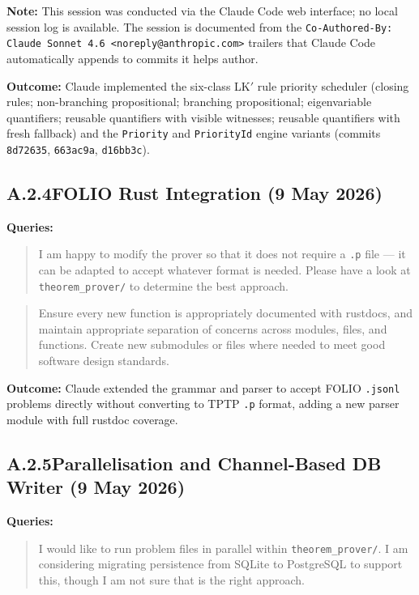 \textbf{Note:} This session was conducted via the Claude Code web interface;
no local session log is available. The session is documented from the
\texttt{Co-Authored-By: Claude Sonnet 4.6 <noreply@anthropic.com>} trailers
that Claude Code automatically appends to commits it helps author.

\textbf{Outcome:} Claude implemented the six-class LK$'$ rule priority scheduler
(closing rules; non-branching propositional; branching propositional;
  eigenvariable quantifiers; reusable quantifiers with visible witnesses;
reusable quantifiers with fresh fallback) and the \texttt{Priority} and
\texttt{PriorityId} engine variants
(commits \texttt{8d72635}, \texttt{663ac9a}, \texttt{d16bb3c}).

\subsection*{A.2.4\quad FOLIO Rust Integration (9 May 2026)}

\textbf{Queries:}
\begin{quote}
  I am happy to modify the prover so that it does not require a \texttt{.p}
  file --- it can be adapted to accept whatever format is needed.
  Please have a look at \texttt{theorem\_prover/} to determine the
  best approach.
\end{quote}

\begin{quote}
  Ensure every new function is appropriately documented with rustdocs, and
  maintain appropriate separation of concerns across modules, files, and
  functions. Create new submodules or files where needed to meet good software
  design standards.
\end{quote}

\textbf{Outcome:} Claude extended the grammar and parser to accept FOLIO
\texttt{.jsonl} problems directly without converting to TPTP \texttt{.p}
format, adding a new parser module with full rustdoc coverage.

\subsection*{A.2.5\quad Parallelisation and Channel-Based DB Writer
(9 May 2026)}

\textbf{Queries:}
\begin{quote}
  I would like to run problem files in parallel within
  \texttt{theorem\_prover/}.
  I am considering migrating persistence from SQLite to PostgreSQL to support
  this, though I am not sure that is the right approach.
\end{quote}

